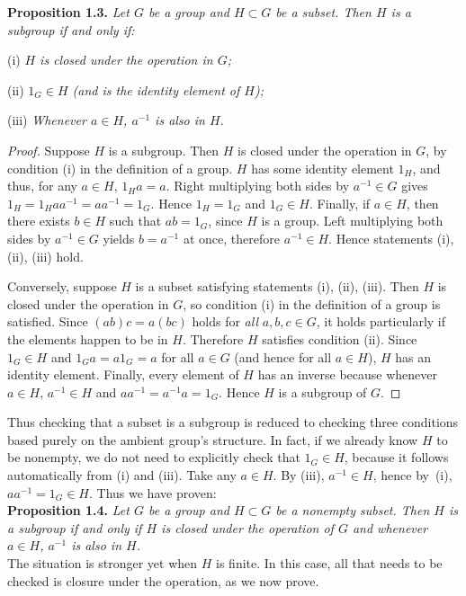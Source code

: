 \documentclass[leqno]{book}
\begin{document}
\noindent\textbf{Proposition 1.3.} \emph{Let $G$ be a group and $H\subset G$ be a subset.  Then $H$ is a subgroup if and only if:} %

(i) \emph{$H$ is closed under the operation in $G$;}

(ii) \emph{$1_G\in H$ (and is the identity element of $H$);}

(iii) \emph{Whenever $a\in H$, $a^{-1}$ is also in $H$.}

\begin{proof}
Suppose $H$ is a subgroup.  Then $H$ is closed under the operation in $G$, by condition (i) in the definition of a group.  $H$ has some identity element $1_H$, and thus, for any $a\in H$, $1_Ha=a$.  Right multiplying both sides by $a^{-1}\in G$ gives $1_H=1_Haa^{-1}=aa^{-1}=1_G$.  Hence $1_H=1_G$ and $1_G\in H$.  Finally, if $a\in H$, then there exists $b\in H$ such that $ab=1_G$, since $H$ is a group.  Left multiplying both sides by $a^{-1}\in G$ yields $b=a^{-1}$ at once, therefore $a^{-1}\in H$.  Hence statements (i), (ii), (iii) hold.

Conversely, suppose $H$ is a subset satisfying statements (i), (ii), (iii).  Then $H$ is closed under the operation in $G$, so condition (i) in the definition of a group is satisfied.  Since $(ab)c=a(bc)$ holds for \emph{all} $a,b,c\in G$, it holds particularly if the elements happen to be in $H$.  Therefore $H$ satisfies condition (ii).  Since $1_G\in H$ and $1_Ga=a1_G=a$ for all $a\in G$ (and hence for all $a\in H$), $H$ has an identity element.  Finally, every element of $H$ has an inverse because whenever $a\in H$, $a^{-1}\in H$ and $aa^{-1}=a^{-1}a=1_G$.  Hence $H$ is a subgroup of $G$.
\end{proof}

\noindent Thus checking that a subset is a subgroup is reduced to checking three conditions based purely on the ambient group's structure.  In fact, if we already know $H$ to be nonempty, we do not need to explicitly check that $1_G\in H$, because it follows automatically from (i) and (iii).  Take any $a\in H$.  By (iii), $a^{-1}\in H$, hence by~(i), $aa^{-1}=1_G\in H$.  Thus we have proven:\\

\noindent\textbf{Proposition 1.4.} \emph{Let $G$ be a group and $H\subset G$ be a nonempty subset.  Then $H$ is a subgroup if and only if $H$ is closed under the operation of $G$ and whenever $a\in H$, $a^{-1}$ is also in $H$.}\\ %

\noindent The situation is stronger yet when $H$ is finite.  In this case, all that needs to be checked is closure under the operation, as we now prove.\\
\end{document}
